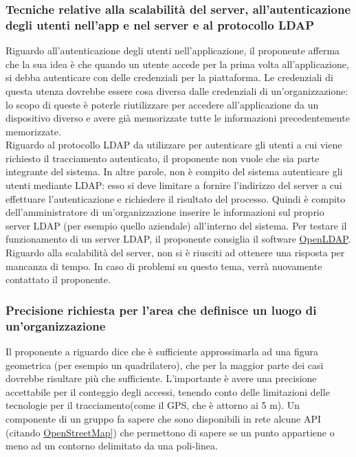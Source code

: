 \subsubsection*{Tecniche relative alla scalabilità del server, all'autenticazione degli utenti nell'app e nel server e al protocollo LDAP}
Riguardo all'autenticazione degli utenti nell'applicazione, il proponente afferma che la sua idea è che quando un utente accede per la prima volta all'applicazione, si debba autenticare con delle credenziali per la piattaforma.
Le credenziali di questa utenza dovrebbe essere cosa diversa dalle credenziali di un'organizzazione: lo scopo di queste è poterle riutilizzare per accedere all'applicazione da un dispositivo diverso e avere già
memorizzate tutte le informazioni precedentemente memorizzate.\\
Riguardo al protocollo LDAP da utilizzare per autenticare gli utenti a cui viene richiesto il tracciamento autenticato, il proponente non vuole che sia parte integrante del sistema.
In altre parole, non è compito del sistema autenticare gli utenti mediante LDAP: esso si deve limitare a fornire l'indirizzo del server a cui effettuare l'autenticazione e richiedere il risultato del processo.
Quindi è compito dell'amministratore di un'organizzazione inserire le informazioni sul proprio server LDAP (per esempio quello aziendale) all'interno del sistema.
Per testare il funzionamento di un server LDAP, il proponente consiglia il software \href{https://www.openldap.org/}{OpenLDAP}.\\
Riguardo alla scalabilità del server, non si è riusciti ad ottenere una risposta per mancanza di tempo. In caso di problemi su questo tema, verrà nuovamente contattato il proponente.

\subsubsection*{Precisione richiesta per l'area che definisce un luogo di un'organizzazione}
Il proponente a riguardo dice che è sufficiente approssimarla ad una figura geometrica (per esempio un quadrilatero), che per la maggior parte dei casi dovrebbe risultare più che sufficiente.
L'importante è avere una precisione accettabile per il conteggio degli accessi, tenendo conto delle limitazioni delle tecnologie per il tracciamento(come il GPS, che è attorno ai 5 m).
Un componente di un gruppo fa sapere che sono disponibili in rete alcune API (citando \href{https://www.openstreetmap.org/}{OpenStreetMap]}) che permettono di sapere se un punto appartiene o meno ad un contorno delimitato da una poli-linea.

